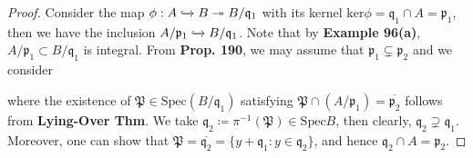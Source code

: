 \documentclass[12pt,a4paper,footinclude=true,headinclude=true]{scrbook} %
\begin{document}
\begin{proof}
    Consider the map $\phi:A\xhookrightarrow{} B\twoheadrightarrow B/\mathfrak{q}_1$ with its kernel $\mathrm{ker}\phi=\mathfrak{q}_1\cap A=\mathfrak{p}_1$, then we have the inclusion $A/\mathfrak{p}_1\xhookrightarrow{} B/\mathfrak{q}_1$. Note that by \textbf{Example 96(a)}, $A/\mathfrak{p}_1\subset B/\mathfrak{q}_1$ is integral. From \textbf{Prop. 190}, we may assume that $\mathfrak{p}_1\subsetneq\mathfrak{p}_2$ and we consider
    \begin{center}
    \end{center}
    where the existence of $\mathfrak{P}\in\mathrm{Spec}(B/\mathfrak{q}_1)$ satisfying $\mathfrak{P}\cap(A/\mathfrak{p}_1)=\overline{\mathfrak{p}_2}$ follows from \textbf{Lying-Over Thm}. We take $\mathfrak{q}_2\coloneqq\pi^{-1}(\mathfrak{P})\in\mathrm{Spec}B$, then clearly, $\mathfrak{q}_2\supsetneq\mathfrak{q}_1$. Moreover, one can show that $\mathfrak{P}=\overline{\mathfrak{q}_2}=\{y+\mathfrak{q}_1:y\in\mathfrak{q}_2\}$, and hence $\mathfrak{q}_2\cap A=\mathfrak{p}_2$.
\end{proof}
\end{document}
